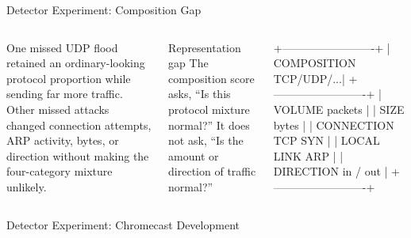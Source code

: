 \documentclass[aspectratio=169,10pt]{beamer}
\begin{document}
\begin{frame}[fragile]{Detector Experiment: Composition Gap}
\begin{columns}[T,onlytextwidth]
One missed UDP flood retained an ordinary-looking protocol proportion while
sending far more traffic. Other missed attacks changed connection attempts, ARP
activity, bytes, or direction without making the four-category mixture unlikely.

\vspace{0.35cm}
\begin{alertblock}{Representation gap}
The composition score asks, ``Is this protocol mixture normal?'' It does not ask,
``Is the amount or direction of traffic normal?''
\end{alertblock}

\begin{asciiart}
+-------------------------+
| COMPOSITION  TCP/UDP/...|
+-------------------------+
| VOLUME       packets    |
| SIZE         bytes      |
| CONNECTION   TCP SYN    |
| LOCAL LINK   ARP        |
| DIRECTION    in / out   |
+-------------------------+
\end{asciiart}
\end{columns}
\end{frame}

\begin{frame}{Detector Experiment: Chromecast Development}
\centering
{}

\end{frame}
\end{document}
